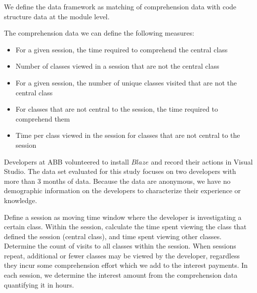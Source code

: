 

We define the data framework as matching of comprehension data with code structure data at the module level.  



The comprehension data we can define the following measures:
\begin{itemize}
	\item[] For a given session, the time required to comprehend the central class
	\item[] Number of classes viewed in a session that are not the central class
	\item[] For a given session, the number of unique classes visited that are not the central class
	\item[] For classes that are not central to the session, the time required to comprehend them
	\item[] Time per class viewed in the session for classes that are not central to the session

\end{itemize}

Developers at ABB volunteered to install $Blaze$ and record their actions in Visual Studio.  The data set evaluated for this study focuses on two developers with more than 3 months of data.  Because the data are anonymous, we have no demographic information on the developers to characterize their experience or knowledge.

Define a session as moving time window where the developer is investigating a certain class.  Within the session, calculate the time spent viewing the class that defined the session (central class), and time spent viewing other classes.  Determine the count of visits to all classes within the session.   When sessions repeat, additional or fewer classes may be viewed by the developer, regardless they incur some comprehension effort which we add to the interest payments.  In each session, we determine the interest amount from the comprehension data quantifying it in hours.  

